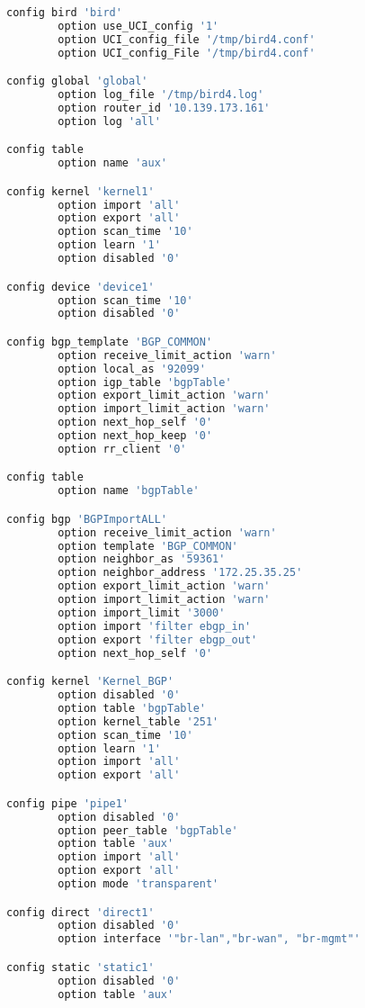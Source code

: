 \begin{lstlisting}[language=bash,caption={UCI Configuration.}]
config bird 'bird'
        option use_UCI_config '1'
        option UCI_config_file '/tmp/bird4.conf'
        option UCI_config_File '/tmp/bird4.conf'

config global 'global'
        option log_file '/tmp/bird4.log'
        option router_id '10.139.173.161'
        option log 'all'

config table
        option name 'aux'

config kernel 'kernel1'
        option import 'all'
        option export 'all'
        option scan_time '10'
        option learn '1'
        option disabled '0'

config device 'device1'
        option scan_time '10'
        option disabled '0'

config bgp_template 'BGP_COMMON'
        option receive_limit_action 'warn'
        option local_as '92099'
        option igp_table 'bgpTable'
        option export_limit_action 'warn'
        option import_limit_action 'warn'
        option next_hop_self '0'
        option next_hop_keep '0'
        option rr_client '0'

config table
        option name 'bgpTable'

config bgp 'BGPImportALL'
        option receive_limit_action 'warn'
        option template 'BGP_COMMON'
        option neighbor_as '59361'
        option neighbor_address '172.25.35.25'
        option export_limit_action 'warn'
        option import_limit_action 'warn'
        option import_limit '3000'
        option import 'filter ebgp_in'
        option export 'filter ebgp_out'
        option next_hop_self '0'

config kernel 'Kernel_BGP'
        option disabled '0'
        option table 'bgpTable'
        option kernel_table '251'
        option scan_time '10'
        option learn '1'
        option import 'all'
        option export 'all'

config pipe 'pipe1'
        option disabled '0'
        option peer_table 'bgpTable'
        option table 'aux'
        option import 'all'
        option export 'all'
        option mode 'transparent'

config direct 'direct1'
        option disabled '0'
        option interface '"br-lan","br-wan", "br-mgmt"'

config static 'static1'
        option disabled '0'
        option table 'aux'
\end{lstlisting}